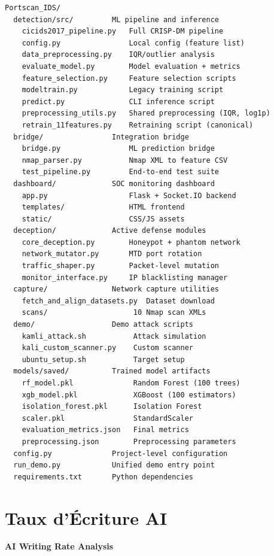 \documentclass[12pt,a4paper]{report}
\begin{document}
\begin{verbatim}
Portscan_IDS/
  detection/src/         ML pipeline and inference
    cicids2017_pipeline.py   Full CRISP-DM pipeline
    config.py                Local config (feature list)
    data_preprocessing.py    IQR/outlier analysis
    evaluate_model.py        Model evaluation + metrics
    feature_selection.py     Feature selection scripts
    modeltrain.py            Legacy training script
    predict.py               CLI inference script
    preprocessing_utils.py   Shared preprocessing (IQR, log1p)
    retrain_11features.py    Retraining script (canonical)
  bridge/                Integration bridge
    bridge.py                ML prediction bridge
    nmap_parser.py           Nmap XML to feature CSV
    test_pipeline.py         End-to-end test suite
  dashboard/             SOC monitoring dashboard
    app.py                   Flask + Socket.IO backend
    templates/               HTML frontend
    static/                  CSS/JS assets
  deception/             Active defense modules
    core_deception.py        Honeypot + phantom network
    network_mutator.py       MTD port rotation
    traffic_shaper.py        Packet-level mutation
    monitor_interface.py     IP blacklisting manager
  capture/               Network capture utilities
    fetch_and_align_datasets.py  Dataset download
    scans/                    10 Nmap scan XMLs
  demo/                  Demo attack scripts
    kamli_attack.sh           Attack simulation
    kali_custom_scanner.py    Custom scanner
    ubuntu_setup.sh           Target setup
  models/saved/          Trained model artifacts
    rf_model.pkl              Random Forest (100 trees)
    xgb_model.pkl             XGBoost (100 estimators)
    isolation_forest.pkl      Isolation Forest
    scaler.pkl                StandardScaler
    evaluation_metrics.json   Final metrics
    preprocessing.json        Preprocessing parameters
  config.py              Project-level configuration
  run_demo.py            Unified demo entry point
  requirements.txt       Python dependencies
\end{verbatim}



\chapter{Taux d'\'{E}criture AI}

\begin{center}
\large\bfseries AI Writing Rate Analysis
\end{center}
\end{document}

